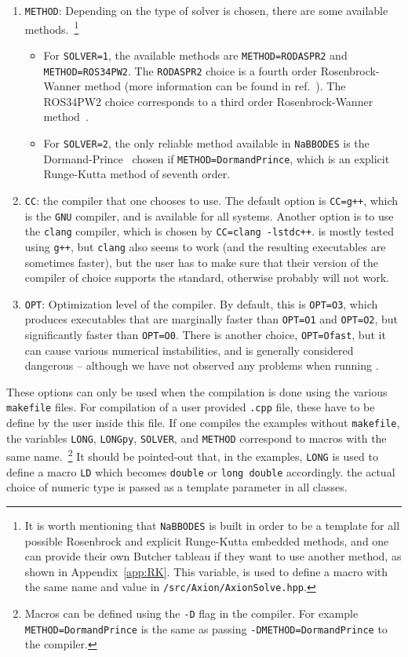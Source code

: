 \documentclass[11pt,a4paper]{article}
\begin{document}
\begin{enumerate}
	\item {\tt METHOD}: Depending on the type of solver is chosen, there are some available methods.~\footnote{It is worth mentioning that {\tt NaBBODES} is built in order to be a template for all possible Rosenbrock and explicit Runge-Kutta embedded methods, and one can provide their own Butcher tableau if they want to use another method, as shown in Appendix~\ref{app:RK}. This variable, is used to define a macro with the same name and value in {\tt \mimes/src/Axion/AxionSolve.hpp}.} 
	\begin{itemize}
		\item 	For {\tt SOLVER=1}, the available methods are 
		{\tt METHOD=RODASPR2} and {\tt METHOD=ROS34PW2}. The {\tt RODASPR2} choice is a fourth order Rosenbrock-Wanner method (more information can be found in ref.~\cite{RANG2015128}). The {ROS34PW2} choice corresponds to a third order Rosenbrock-Wanner method~\cite{RangAngermann2005}. 
		\item 	For {\tt SOLVER=2}, the only reliable method available in {\tt NaBBODES} is the Dormand-Prince~\cite{DORMAND198019} chosen if {\tt METHOD=DormandPrince}, which is an explicit Runge-Kutta method of seventh order.
	\end{itemize}
	\item {\tt CC}: the \CPP compiler that one chooses to use. The default option is {\tt CC=g++}, which is the {\tt GNU} \CPP compiler, and is available for all systems. Another option is to use the {\tt clang} compiler, which is chosen by {\tt CC=clang -lstdc++}. \mimes is mostly tested using {\tt g++}, but {\tt clang} also seems to work (and the resulting executables are sometimes faster), but the user has to make sure that their version of the compiler of choice supports the  standard, otherwise \mimes probably will not work.
	\item {\tt OPT}: Optimization level of the compiler. By default, this is {\tt OPT=O3}, which produces executables that are marginally faster than {\tt OPT=O1} and {\tt OPT=O2}, but significantly faster than {\tt OPT=O0}. There is another choice, {\tt OPT=Ofast}, but it can cause various numerical instabilities, and is generally considered dangerous -- although we have not observed any problems when running \mimes. 
\end{enumerate}
%
These options can only be used when the compilation is done using the various {\tt makefile} files. For compilation of a user provided {\tt .cpp} file, these have to be define by the user inside this file. If one compiles the examples without {\tt makefile}, the variables {\tt LONG},  {\tt LONGpy}, {\tt SOLVER}, and {\tt METHOD} correspond to macros with the same name.~\footnote{Macros can be defined using the {\tt -D} flag
	in the compiler. For example {\tt METHOD=DormandPrince} is the same as passing {\tt -DMETHOD=DormandPrince} to the compiler.} It should be pointed-out that,  in the examples, {\tt LONG} is used to define a macro {\tt LD} which becomes {\tt double} or {\tt long double} accordingly. the actual choice of numeric type is passed as a template parameter in all classes.
\end{document}
